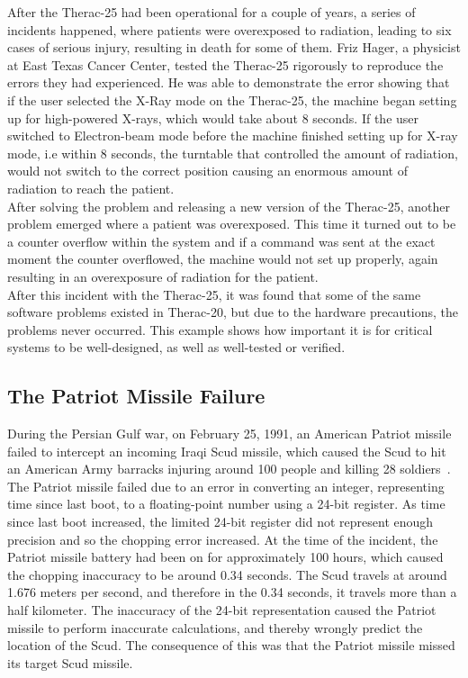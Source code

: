 After the Therac-25 had been operational for a couple of years, a series of incidents happened, where patients were overexposed to radiation, leading to six cases of serious injury, resulting in death for some of them. Friz Hager, a physicist at East Texas Cancer Center, tested the Therac-25 rigorously to reproduce the errors they had experienced. He was able to demonstrate the error showing that if the user selected the X-Ray mode on the Therac-25, the machine began setting up for high-powered X-rays, which would take about 8 seconds. If the user switched to Electron-beam mode before the machine finished setting up for X-ray mode, i.e within 8 seconds, the turntable that controlled the amount of radiation, would not switch to the correct position causing an enormous amount of radiation to reach the patient.\\
After solving the problem and releasing a new version of the Therac-25, another problem emerged where a patient was overexposed. This time it turned out to be a counter overflow within the system and if a command was sent at the exact moment the counter overflowed, the machine would not set up properly, again resulting in an overexposure of radiation for the patient. \\
After this incident with the Therac-25, it was found that some of the same software problems existed in Therac-20, but due to the hardware precautions, the problems never occurred.
This example shows how important it is for critical systems to be well-designed, as well as well-tested or verified.

\subsection{The Patriot Missile Failure}
During the Persian Gulf war, on February 25, 1991, an American Patriot missile failed to intercept an incoming Iraqi Scud missile, which caused the Scud to hit an American Army barracks injuring around 100 people and killing 28 soldiers~\cite{patriot1991}.\\

The Patriot missile failed due to an error in converting an integer, representing time since last boot, to a floating-point number using a 24-bit register. As time since last boot increased, the limited 24-bit register did not represent enough precision and so the chopping error increased. At the time of the incident, the Patriot missile battery had been on for approximately 100 hours, which caused the chopping inaccuracy to be around 0.34 seconds. The Scud travels at around 1.676 meters per second, and therefore in the 0.34 seconds, it travels more than a half kilometer.
The inaccuracy of the 24-bit representation caused the Patriot missile to perform inaccurate calculations, and thereby wrongly predict the location of the Scud. The consequence of this was that the Patriot missile missed its target Scud missile.

